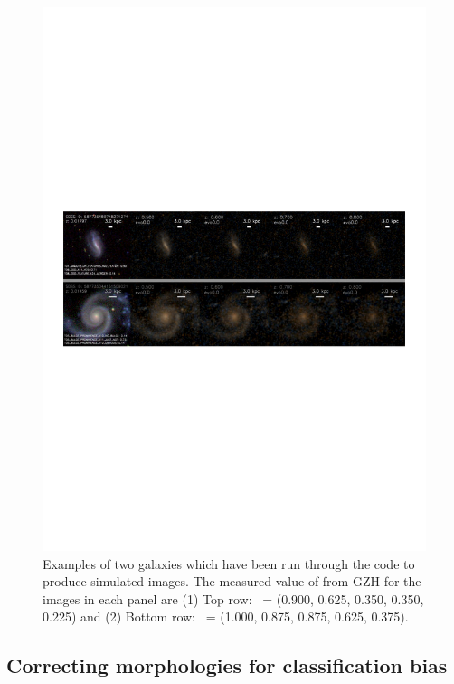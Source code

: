 \documentclass[twocolumn]{aastex6}
\begin{document}
\begin{figure}
\center
\includegraphics[width=160mm]{figures/example_ferengi.pdf}
\caption{Examples of two galaxies which have been run through the \ferengi{} code to produce simulated \hst{} images. The measured value of \ffeatures{} from GZH for the images in each panel are (1) Top row: \ffeatures~= (0.900, 0.625, 0.350, 0.350, 0.225) and (2) Bottom row: \ffeatures~= (1.000, 0.875, 0.875, 0.625, 0.375). \label{fig:exampleFERENGI}}
\end{figure}

\subsection{Correcting morphologies for classification bias}\label{ssec:zeta}
\end{document}
